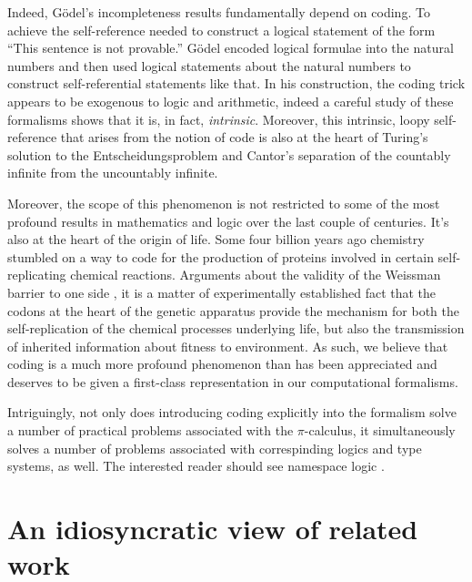 Indeed, G\"odel's incompleteness results fundamentally depend on
coding. To achieve the self-reference needed to construct a logical
statement of the form ``This sentence is not provable.'' G\"odel
encoded logical formulae into the natural numbers and then used
logical statements about the natural numbers to construct
self-referential statements like that. In his construction, the coding
trick appears to be exogenous to logic and arithmetic, indeed a
careful study of these formalisms shows that it is, in fact,
\emph{intrinsic}. Moreover, this intrinsic, loopy self-reference that
arises from the notion of code is also at the heart of Turing's
solution to the Entscheidungsproblem and Cantor's separation of the
countably infinite from the uncountably infinite.

Moreover, the scope of this phenomenon is not restricted to some of
the most profound results in mathematics and logic over the last
couple of centuries. It's also at the heart of the origin of
life. Some four billion years ago chemistry stumbled on a way to code
for the production of proteins involved in certain self-replicating
chemical reactions. Arguments about the validity of the Weissman
barrier to one side \cite{William2018TheGA}, it is a matter of
experimentally established fact that the codons at the heart of the
genetic apparatus provide the mechanism for both the self-replication
of the chemical processes underlying life, but also the transmission
of inherited information about fitness to environment. As such, we
believe that coding is a much more profound phenomenon than has been
appreciated and deserves to be given a first-class representation in
our computational formalisms.

Intriguingly, not only does introducing coding explicitly into the
formalism solve a number of practical problems associated with the
$\pi$-calculus, it simultaneously solves a number of problems
associated with correspinding logics and type systems, as well. The
interested reader should see namespace logic
\cite{DBLP:conf/tgc/MeredithR05}.

\section{An idiosyncratic view of related work}

